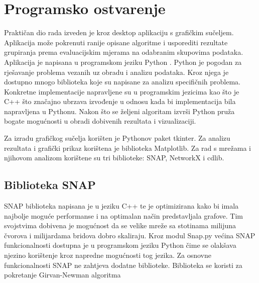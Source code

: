 \chapter{Programsko ostvarenje}

Praktičan dio rada izveden je kroz desktop aplikaciju s grafičkim sučeljem. Aplikacija može pokrenuti ranije opisane algoritme i usporediti rezultate grupiranja prema evaluacijskim mjerama na odabranim skupovima podataka. Aplikacija je napisana u programskom jeziku Python \cite{van1995python}. Python je pogodan za rješavanje problema vezanih uz obradu i analizu podataka. Kroz njega je dostupno mnogo biblioteka koje su napisane za analizu specifičnih problema. Konkretne implementacije napravljene su u programskim jezicima kao što je C++ što značajno ubrzava izvođenje u odnosu kada bi implementacija bila napravljena u Pythonu. Nakon što se željeni algoritam izvrši Python pruža bogate mogućnosti u obradi dobivenih rezultata i vizualizaciji.

Za izradu grafičkog sučelja korišten je Pythonov paket tkinter. Za analizu rezultata i grafički prikaz korištena je biblioteka Matplotlib. Za rad s mrežama i njihovom analizom korištene su tri biblioteke: SNAP, NetworkX i cdlib. 

\section{Biblioteka SNAP}
SNAP biblioteka \cite{leskovec2016snap} napisana je u jeziku C++ te je optimizirana kako bi imala najbolje moguće performanse i na optimalan način predstavljala grafove. Tim svojstvima dobivena je mogućnost da se velike mreže sa stotinama milijuna čvorova i milijardama bridova dobro skaliraju. Kroz modul Snap.py većina SNAP funkcionalnosti dostupna je u programskom jeziku Python čime se olakšava njezino korištenje kroz napredne mogućnosti tog jezika. Za osnovne funkcionalnosti SNAP ne zahtjeva dodatne biblioteke. Biblioteka se koristi za pokretanje Girvan-Newman algoritma



